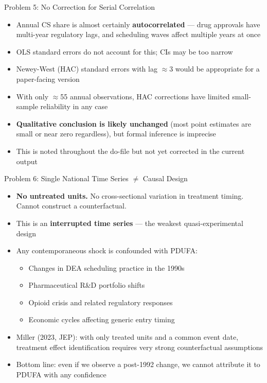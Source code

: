 \documentclass[10pt]{beamer}
\begin{document}
\begin{frame}[t]{Problem 5: No Correction for Serial Correlation}
  \begin{itemize}
    \item Annual CS share is almost certainly \textbf{autocorrelated} --- drug
          approvals have multi-year regulatory lags, and scheduling waves
          affect multiple years at once
    \item OLS standard errors do not account for this; CIs may be too narrow
    \item Newey-West (HAC) standard errors with lag $\approx 3$ would be
          appropriate for a paper-facing version
    \item With only $\approx$55 annual observations, HAC corrections have
          limited small-sample reliability in any case
    \item \textbf{Qualitative conclusion is likely unchanged} (most point
          estimates are small or near zero regardless), but formal inference
          is imprecise
    \item This is noted throughout the do-file but not yet corrected in the
          current output
  \end{itemize}
\end{frame}

\begin{frame}[t]{Problem 6: Single National Time Series $\ne$ Causal Design}
  \begin{itemize}
    \item \textbf{No untreated units.} No cross-sectional variation in
          treatment timing. Cannot construct a counterfactual.
    \item This is an \textbf{interrupted time series} --- the weakest
          quasi-experimental design
    \item Any contemporaneous shock is confounded with PDUFA:
          \begin{itemize}
            \item Changes in DEA scheduling practice in the 1990s
            \item Pharmaceutical R\&D portfolio shifts
            \item Opioid crisis and related regulatory responses
            \item Economic cycles affecting generic entry timing
          \end{itemize}
    \item Miller (2023, JEP): with only treated units and a common event
          date, treatment effect identification requires very strong
          counterfactual assumptions
    \item \alert{Bottom line:} even if we observe a post-1992 change, we
          cannot attribute it to PDUFA with any confidence
  \end{itemize}
\end{frame}
\end{document}
